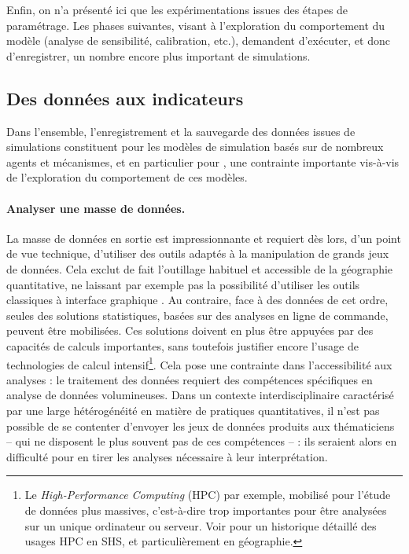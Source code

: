 Enfin, on n'a présenté ici que les expérimentations issues des étapes de paramétrage.
Les phases suivantes, visant à l'exploration du comportement du modèle (analyse de sensibilité, calibration, etc.), demandent d'exécuter, et donc d'enregistrer, un nombre encore plus important de simulations.

\subsection{Des données aux indicateurs}\label{subsec:donnees-indicateurs}

Dans l'ensemble, l'enregistrement et la sauvegarde des données issues de simulations constituent pour les modèles de simulation basés sur de nombreux agents et mécanismes, et en particulier pour \simfeodal{}, une contrainte importante vis-à-vis de l'exploration du comportement de ces modèles.

\paragraph{Analyser une masse de données.}
La masse de données en sortie est impressionnante et requiert dès lors, d'un point de vue technique, d'utiliser des outils adaptés à la manipulation de grands jeux de données.
Cela exclut de fait l'outillage habituel et accessible de la géographie quantitative, ne laissant par exemple pas la possibilité d'utiliser les outils classiques à interface graphique .
Au contraire, face à des données de cet ordre, seules des solutions statistiques, basées sur des analyses en ligne de commande, peuvent être mobilisées.
Ces solutions doivent en plus être appuyées par des capacités de calculs importantes, sans toutefois justifier encore l'usage de technologies de calcul intensif\footnote{
	Le \og \textit{High-Performance Computing}\fg{} (HPC) par exemple, mobilisé pour l'étude de données plus massives, c'est-à-dire trop importantes pour être analysées sur un unique ordinateur ou serveur.
	Voir \textcite[223--283]{rey-coyrehourcq_plateforme_2015} pour un historique détaillé des usages HPC en SHS, et particulièrement en géographie.
}.
Cela pose une contrainte dans l'accessibilité aux analyses : le traitement des données requiert des compétences spécifiques en analyse de données volumineuses.
Dans un contexte interdisciplinaire caractérisé par une large hétérogénéité en matière de pratiques quantitatives, il n'est pas possible de se contenter d'envoyer les jeux de données produits aux thématiciens -- qui ne disposent le plus souvent pas de ces compétences -- : ils seraient alors en difficulté pour en tirer les analyses nécessaire à leur interprétation.


